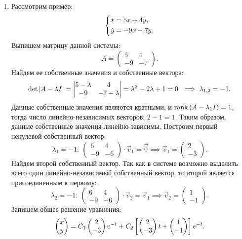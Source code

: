		\begin{enumerate}
			\item Рассмотрим пример:
				\[ \left\lbrace \begin{aligned} \dot{x} &= 5x + 4y,\\ \dot{y} &= -9x - 7y. \end{aligned} \right. \]
				Выпишем матрицу данной системы:
				\[ A = \begin{pmatrix} 5 & 4 \\ -9 & -7 \end{pmatrix}. \]
				Найдем ее собственные значения и собственные вектора:
				\[ \det\left\vert A - \lambda I \right\vert = \begin{vmatrix} 5 - \lambda & 4 \\ -9 & -7 - \lambda \end{vmatrix} = \lambda^2 + 2\lambda + 1 = 0 ~ \implies \lambda_{1, 2} = -1. \]
				Данные собственные значения являются кратными, и $\operatorname{rank}\left( A-\lambda_1 I \right) = 1$, тогда число линейно-независимых векторов: $2 - 1 = 1$. Таким образом, данные собственные значения линейно-зависимы. Построим первый ненулевой собственный вектор:
				\[ \lambda_1 = -1: ~ \begin{pmatrix} 6 & 4 \\ -9 & -6 \end{pmatrix} \cdot \vec{v}_1 = \vec{0} \implies \vec{v}_1 = \begin{pmatrix} 2 \\ -3 \end{pmatrix}. \]
				Найдем второй собственный вектор. Так как в системе возможно выделить всего один линейно-независимый собственный вектор, то второй является присоединенным к первому:
				\[ \lambda_2 = -1: ~ \begin{pmatrix} 6 & 4 \\ -9 & -6 \end{pmatrix} \cdot \vec{v}_2 = \vec{v}_1 \implies \vec{v}_2 = \begin{pmatrix} 1 \\ -1 \end{pmatrix}. \]
				Запишем общее решение уравнения:
				\[ \begin{pmatrix} x \\ y \end{pmatrix} = C_1 \begin{pmatrix} 2 \\ -3 \end{pmatrix} e^{-t} + C_2 \left[ \begin{pmatrix} 2 \\ -3 \end{pmatrix} t + \begin{pmatrix} 1 \\ -1 \end{pmatrix} \right] e^{-t}. \]

\end{enumerate}
